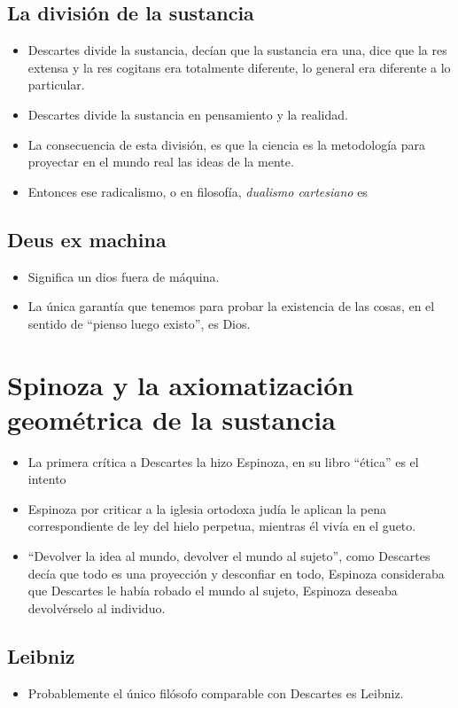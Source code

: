 \subsection{La división de la sustancia}
\begin{itemize}
    \item Descartes divide la sustancia, decían que la sustancia era una, dice que la res extensa y la res cogitans era totalmente diferente, lo general era diferente a lo particular. 
    \item Descartes divide la sustancia en pensamiento y la realidad.
    \item La consecuencia de esta división, es que la ciencia es la metodología para proyectar en el mundo real las ideas de la mente. 
    \item Entonces ese radicalismo, o en filosofía, \emph{dualismo cartesiano} es 
\end{itemize}

\subsection{Deus ex machina}
\begin{itemize}
    \item Significa un dios fuera de máquina.
    \item La única garantía que tenemos para probar la existencia de las cosas, en el sentido de ``pienso luego existo'', es Dios. 
\end{itemize}

\section{Spinoza y la axiomatización geométrica de la sustancia}
\begin{itemize}
    \item La primera crítica a Descartes la hizo Espinoza, en su libro ``ética'' es el intento 
    \item Espinoza por criticar a la iglesia ortodoxa judía le aplican la pena correspondiente de ley del hielo perpetua, mientras él vivía en el gueto.
    \item ``Devolver la idea al mundo, devolver el mundo al sujeto'', como Descartes decía que todo es una proyección y desconfiar en todo, Espinoza consideraba que Descartes le había robado el mundo al sujeto, Espinoza deseaba devolvérselo al individuo.
\end{itemize}

\subsection{Leibniz}
\begin{itemize}
    \item Probablemente el único filósofo comparable con Descartes es Leibniz. 
\end{itemize}


